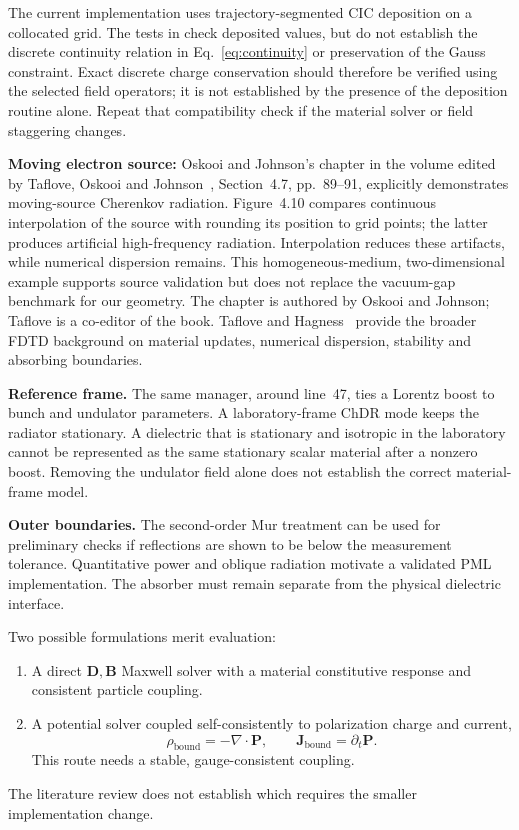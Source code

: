 \documentclass[11pt,a4paper]{article}
\numberwithin{equation}{section}
\begin{document}
The current implementation uses trajectory-segmented CIC deposition on
a collocated grid. The tests in
 check deposited
values, but do not establish the discrete continuity relation in
Eq.~\eqref{eq:continuity} or preservation of the Gauss constraint.
Exact discrete charge conservation should therefore be verified using
the selected field operators; it is not established by the presence of
the deposition routine alone. Repeat that compatibility check if the
material solver or field staggering changes.

\textbf{Moving electron source:}
Oskooi and Johnson's chapter in the volume edited by Taflove, Oskooi and
Johnson~\cite{taflove2013advances,oskooi2013sources},
Section~4.7, pp.~89--91, explicitly demonstrates moving-source Cherenkov
radiation. Figure~4.10 compares continuous interpolation of the source
with rounding its position to grid points; the latter produces artificial
high-frequency radiation. Interpolation reduces these artifacts, while
numerical dispersion remains. This homogeneous-medium, two-dimensional
example supports source validation but does not replace the
vacuum-gap benchmark for our geometry. The chapter is authored by
Oskooi and Johnson; Taflove is a co-editor of the book.
Taflove and Hagness~\cite{taflove2005computational} provide the broader
FDTD background on material updates, numerical dispersion, stability
and absorbing boundaries.

\textbf{Reference frame.}
The same manager, around line~47, ties a Lorentz boost to bunch and
undulator parameters. A laboratory-frame ChDR mode keeps the radiator
stationary. A dielectric that is stationary and isotropic in the laboratory
cannot be represented as the same stationary scalar material after a
nonzero boost. Removing the undulator field alone does not establish
the correct material-frame model.

\textbf{Outer boundaries.}
The second-order Mur treatment can be used for preliminary checks if
reflections are shown to be below the measurement tolerance. Quantitative
power and oblique radiation motivate a validated PML implementation.
The absorber must remain separate from the physical dielectric interface.

Two possible formulations merit evaluation:
\begin{enumerate}
 \item A direct \(\mathbf D,\mathbf B\) Maxwell solver with a material
       constitutive response and consistent particle coupling.
 \item A potential solver coupled self-consistently to polarization
       charge and current,
       \begin{equation}
       \rho_{\mathrm{bound}}=-\nabla\cdot\mathbf P,\qquad
       \mathbf J_{\mathrm{bound}}=\partial_t\mathbf P.
       \end{equation}
       This route needs a stable, gauge-consistent coupling.
\end{enumerate}
The literature review does not establish which requires the smaller
implementation change.
\end{document}
